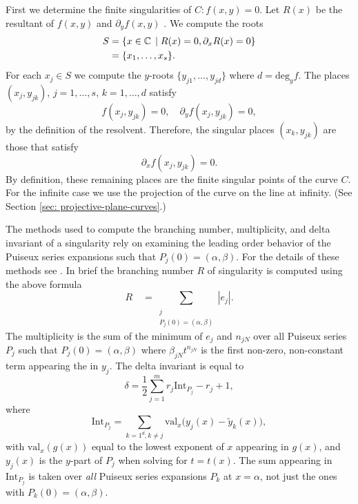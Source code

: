 First we determine the finite singularities of $C : f(x,y) = 0$. Let $R(x)$ be
the resultant of $f(x,y)$ and $\partial_y f(x,y)$ \cite{Griffiths89}. We compute
the roots
\begin{align*}
    S &= \{ x \in \operatorname{\mathbb{C}} \; | \; R(x) = 0, \partial_x R(x) = 0 \} \\
      &= \{ x_1, \ldots, x_s \}.
\end{align*}
For each $x_j \in S$ we compute the $y$-roots $\{y_{j1},\ldots,y_{jd}\}$
where $d = \text{deg}_y f$. The places $(x_j,y_{jk})$, $j=1,\ldots,s$,
$k=1,\ldots,d$ satisfy
\[
    f(x_j,y_{jk}) = 0, \quad \partial_y f(x_j,y_{jk}) = 0,
\]
by the definition of the resolvent. Therefore, the singular places
$(x_k,y_{jk})$ are those that satisfy
\[
    \partial_x f(x_j,y_{jk}) = 0.
\]
By definition, these remaining places are the finite singular points of the
curve $C$. For the infinite case we use the projection of the curve on the line
at infinity. (See Section \ref{sec: projective-plane-curves}.)



The methods used to compute the branching number, multiplicity, and delta
invariant of a singularity rely on examining the leading order behavior of the
Puiseux series expansions such that $P_j(0) = (\alpha, \beta)$. For the details
of these methods see \cite{DeconinckPatterson11}. In brief the branching number
$R$ of singularity is computed using the above formula
\[
  R \quad = \sum_{\substack{j \\ P_j(0)=(\alpha,\beta)}} |e_j|.
\]
The multiplicity is the sum of the minimum of $e_j$ and $n_{jN}$ over all
Puiseux series $P_j$ such that $P_j(0) = (\alpha,\beta)$ where $\beta_{jN} t
^{n_{jN}}$ is the first non-zero, non-constant term appearing the in $y_j$. The
delta invariant is equal to
\[
    \delta = \frac{1}{2}\sum_{j=1}^m r_j \text{Int}_{P_j} - r_j + 1,
\]
where
\[
  \text{Int}_{P_j} = \sum_{k=1^d, k \neq j} \text{val}_x \big( y_j(x) -
  \tilde{y}_k(x) \big),
\]
with $\text{val}_x( g(x))$ equal to the lowest exponent of $x$ appearing in
$g(x)$, and $y_j(x)$ is the $y$-part of $P_j$ when solving for $t = t(x)$. The
sum appearing in $\text{Int}_{P_j}$ is taken over {\it all} Puiseux series
expansions $P_k$ at $x = \alpha$, not just the ones with $P_k(0) = (\alpha,
\beta)$.


